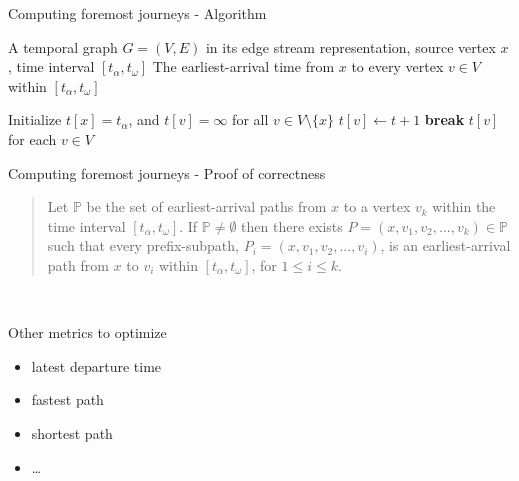 \documentclass{beamer}
\begin{document}
\begin{frame}{Computing foremost journeys - Algorithm}
\begin{algorithm}[H]
\caption{Computing earliest-arrival time}
\begin{algorithmic}[1]
\footnotesize
\Require A temporal graph $G = (V, E)$ in its edge stream representation, source vertex $x$, time interval $[t_\alpha, t_\omega]$
\Ensure The earliest-arrival time from $x$ to every vertex $v \in V$ within $[t_\alpha, t_\omega]$

\State Initialize $t[x] = t_\alpha$, and $t[v] = \infty$ for all $v \in V \setminus \{x\}$
            \State $t[v] \gets t + 1$
        \EndIf
        \State \textbf{break} 
    \EndIf
\EndFor
\State \Return $t[v]$ for each $v \in V$
\end{algorithmic}
\end{algorithm}
\cite{PathProblems}
\end{frame}

\begin{frame}{Computing foremost journeys - Proof of correctness}

  \begin{quote}
    Let $\mathbb{P}$ be the set of earliest-arrival paths from $x$ to a vertex $v_k$ within the time interval $[t_\alpha, t_\omega ]$. If $\mathbb{P} \not = \emptyset$ then there exists $P = (x, v_1, v_2, ..., v_k) \in \mathbb{P}$ such that every prefix-subpath, $P_i = (x, v_1, v_2, ..., v_i)$, is an earliest-arrival path from $x$ to $v_i$ within $[t_\alpha, t_\omega ]$, for $1 \leq i \leq k$.
  \end{quote} \\[3ex]

\end{frame}

\begin{frame}{Other metrics to optimize}
  \begin{itemize}
    \item latest departure time
    \item fastest path
    \item shortest path
    \item \dots
  \end{itemize}
\end{frame}
\end{document}
